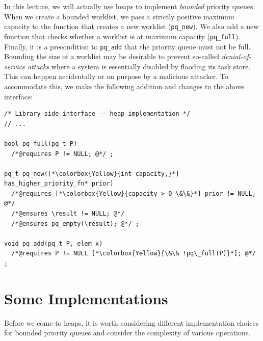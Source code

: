 In this lecture, we will actually use heaps to implement
\emph{bounded} priority queues. When we create a bounded worklist, we
pass a strictly positive maximum capacity to the function that creates
a new worklist (\lstinline'pq_new'). We also add a new function that
checks whether a worklist is at maximum capacity
(\lstinline'pq_full'). Finally, it is a precondition to
\lstinline'pq_add' that the priority queue must not be full.  Bounding
the size of a worklist may be desirable to prevent so-called
\emph{denial-of-service attacks} where a system is essentially
disabled by flooding its task store.  This can happen accidentally or
on purpose by a malicious attacker.  To accommodate this, we make the
following addition and changes to the above interface:
\begin{lstlisting}[language={[C0]C}]
/* Library-side interface -- heap implementation */
// ...

bool pq_full(pq_t P)
  /*@requires P != NULL; @*/ ;

pq_t pq_new([*\colorbox{Yellow}{int capacity,}*] has_higher_priority_fn* prior)
  /*@requires [*\colorbox{Yellow}{capacity > 0 \&\&}*] prior != NULL; @*/
  /*@ensures \result != NULL; @*/
  /*@ensures pq_empty(\result); @*/ ;

void pq_add(pq_t P, elem x)
  /*@requires P != NULL [*\colorbox{Yellow}{\&\& !pq\_full(P)}*]; @*/ ;

\end{lstlisting}




\section{Some Implementations}
\label{sec:pq:strawmen}

Before we come to heaps, it is worth considering different
implementation choices for bounded priority queues and consider the
complexity of various operations.

